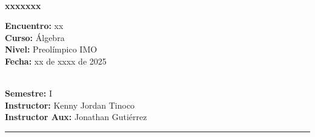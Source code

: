 \begin{center}
    \ \\
    \vspace{-1mm}
    \textbf{\Large xxxxxxx}
\end{center}
\vspace{-5mm}
\begin{multicols}{2}
{
    \textbf{Encuentro:} xx\\
    \textbf{Curso:} Álgebra\\
    \textbf{Nivel:} Preolímpico IMO\\
    \textbf{Fecha:} xx de xxxx de 2025\\
    \begin{flushright}
        \ \\
        \textbf{Semestre:} I\\
        \textbf{Instructor:} Kenny Jordan Tinoco\\
        \textbf{Instructor Aux:} Jonathan Gutiérrez
    \end{flushright}
}
\end{multicols}
\vspace{-4mm}
\hrule
\tableofcontents

\thispagestyle{first-page-style}